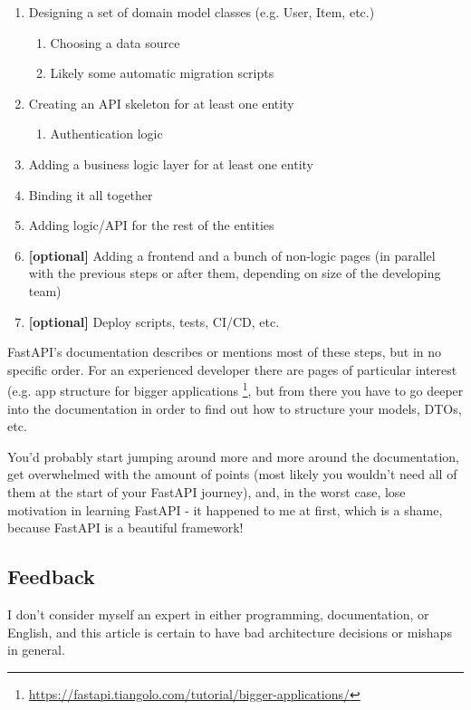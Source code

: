 \documentclass{article}
\newcommand{\flink}[1]{\footnote{\href{#1}{#1}}}
\newcommand{\optional}{{\rmfamily\bfseries\color{gray} [optional] }}
\begin{document}
\begin{enumerate}
    \item Designing a set of domain model classes (e.g. User, Item, etc.)
        \begin{enumerate}
            \item Choosing a data source
            \item Likely some automatic migration scripts
        \end{enumerate}
    \item Creating an API skeleton for at least one entity
        \begin{enumerate}
            \item Authentication logic
        \end{enumerate}
    \item Adding a business logic layer for at least one entity
    \item Binding it all together
    \item Adding logic/API for the rest of the entities
    \item \optional Adding a frontend and a bunch of non-logic pages (in parallel with the previous steps or after them, depending on size of the developing team)
    \item \optional Deploy scripts, tests, CI/CD, etc.
\end{enumerate}

FastAPI's documentation describes or mentions most of these steps, but in no specific order. For an experienced developer there are pages of particular interest (e.g. app structure for bigger applications \flink{https://fastapi.tiangolo.com/tutorial/bigger-applications/}, but from there you have to go deeper into the documentation in order to find out how to structure your models, DTOs, etc.

You'd probably start jumping around more and more around the documentation, get overwhelmed with the amount of points (most likely you wouldn't need all of them at the start of your FastAPI journey), and, in the worst case, lose motivation in learning FastAPI - it happened to me at first, which is a shame, because FastAPI is a beautiful framework!

\subsection{Feedback}

I don't consider myself an expert in either programming, documentation, or English, and this article is certain to have bad architecture decisions or mishaps in general.
\end{document}
